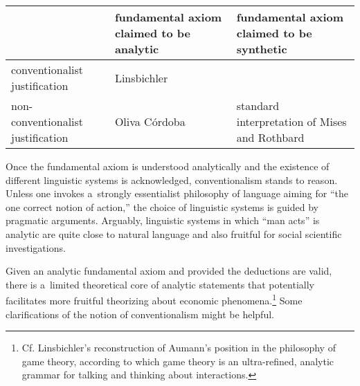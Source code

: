\begin{flushleft}









\begin{supertabular}{|m{5.5410004cm}|m{4.714cm}|m{5.129cm}|}

\hline

&

fundamental axiom claimed to be analytic &

fundamental axiom claimed to be synthetic\\\hline

conventionalist justification &

Linsbichler &

\\\hline

non-conventionalist justification &

Oliva Córdoba &

standard interpretation of Mises and Rothbard\\\hline

\end{supertabular}

\end{flushleft}


Once the fundamental axiom is understood analytically and the existence of different linguistic systems is acknowledged, conventionalism stands to reason. Unless one invokes a~strongly essentialist philosophy of language aiming for ``the one correct notion of action,'' the choice of linguistic systems is guided by pragmatic arguments. Arguably, linguistic systems in which ``man acts'' is analytic are quite close to natural language and also fruitful for social scientific investigations.



Given an analytic fundamental axiom and provided the deductions are valid, there is a~limited theoretical core of analytic statements that potentially facilitates more fruitful theorizing about economic phenomena.\footnote{Cf. Linsbichler's 
\parencite*[][]{linsbichler_ultra-refined_2023} %
 reconstruction of Aumann's position in the philosophy of game theory, according to which game theory is an ultra-refined, analytic grammar for talking and thinking about interactions.} Some clarifications of the notion of conventionalism might be helpful.



